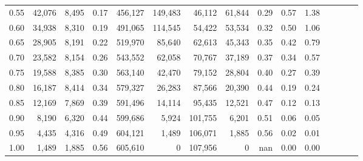 \begin{tabular}{rrrcrrrrrrrrrrr}
0.55 &  42,076 &  8,495 &                                       0.17 &  456,127 &  149,483 &   46,112 &   61,844 &  0.29 &  0.57 &                         1.38 \\
0.60 &  34,938 &  8,310 &                                       0.19 &  491,065 &  114,545 &   54,422 &   53,534 &  0.32 &  0.50 &                         1.06 \\
0.65 &  28,905 &  8,191 &                                       0.22 &  519,970 &   85,640 &   62,613 &   45,343 &  0.35 &  0.42 &                         0.79 \\
0.70 &  23,582 &  8,154 &                                       0.26 &  543,552 &   62,058 &   70,767 &   37,189 &  0.37 &  0.34 &                         0.57 \\
0.75 &  19,588 &  8,385 &                                       0.30 &  563,140 &   42,470 &   79,152 &   28,804 &  0.40 &  0.27 &                         0.39 \\
0.80 &  16,187 &  8,414 &                                       0.34 &  579,327 &   26,283 &   87,566 &   20,390 &  0.44 &  0.19 &                         0.24 \\
0.85 &  12,169 &  7,869 &                                       0.39 &  591,496 &   14,114 &   95,435 &   12,521 &  0.47 &  0.12 &                         0.13 \\
0.90 &   8,190 &  6,320 &                                       0.44 &  599,686 &    5,924 &  101,755 &    6,201 &  0.51 &  0.06 &                         0.05 \\
0.95 &   4,435 &  4,316 &                                       0.49 &  604,121 &    1,489 &  106,071 &    1,885 &  0.56 &  0.02 &                         0.01 \\
1.00 &   1,489 &  1,885 &                                       0.56 &  605,610 &        0 &  107,956 &        0 &   nan &  0.00 &                         0.00 \\
\bottomrule
\end{tabular}
